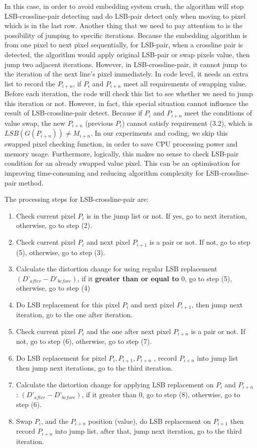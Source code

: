 In this case, in order to avoid embedding system crush, the algorithm will stop LSB-crossline-pair detecting and do LSB-pair detect only when moving to pixel which is in the last row. Another thing that we need to pay attention to is the possibility of jumping to specific iterations. Because the embedding algorithm is from one pixel to next pixel sequentially, for LSB-pair, when a crossline pair is detected, the algorithm would apply original LSB-pair or swap pixels value, then jump two adjacent iterations. However, in LSB-crossline-pair, it cannot jump to the iteration of the next line’s pixel immediately. In code level, it needs an extra list to record the \(P_{i+n}\), if \(P_{i}\) and \(P_{i+n}\) meet all requirements of swapping value. Before each iteration, the code will check this list to see whether we need to jump this iteration or not. However, in fact, this special situation cannot influence the result of LSB-crossline-pair detect. Because if \(P_{i}\) and \(P_{i+n}\) meet the conditions of value swap, the new \(P_{i+n}\) (previous \(P_{i}\)) cannot satisfy requirement (3.2), which is \(LSB(G(P_{i+n})) \neq M_{i+n}\). In our experiments and coding, we skip this swapped pixel checking function, in order to save CPU processing power and memory usage. Furthermore, logically, this makes no sense to check LSB-pair condition for an already swapped value pixel. This can be an optimisation for improving time-consuming and reducing algorithm complexity for LSB-crossline-pair method.  

The processing steps for LSB-crossline-pair are:

\begin{enumerate}
\item Check current pixel \(P_{i}\) is in the jump list or not. If yes, go to next iteration, otherwise, go to step (2).
\item Check current pixel \(P_{i}\) and next pixel \(P_{i+1}\) is a pair or not. If not, go to step (5), otherwise, go to step (3).
\item Calculate the distortion change for using regular LSB replacement \((D’_{after} - D’_{before})\), if it \textbf{greater than or equal to} 0, go to step (5), otherwise, go to step (4)
\item Do LSB replacement for this pixel \(P_{i}\) and next pixel \(P_{i+1}\), then jump next iteration, go to the one after iteration.
\item Check current pixel \(P_{i}\) and the one after next pixel \(P_{i+n}\) is a pair or not. If not, go to step (6), otherwise, go to step (7).
\item Do LSB replacement for pixel \(P_{i}, P_{i+1}, P_{i+n}\) , record \(P_{i+n}\) into jump list then jump next iterations, go to the third iteration.
\item Calculate the distortion change for applying LSB replacement on \(P_{i}\) and \(P_{i+n}\):  \((D’_{after} - D’_{before})\), if it greater than 0, go to step (8), otherwise, go to step (6).
\item Swap \(P_{i}\), and the \(P_{i+n}\) position (value), do LSB replacement on \(P_{i+1}\) then record \(P_{i+n}\) into jump list, after that, jump next iteration, go to the third iteration.
\end{enumerate}

